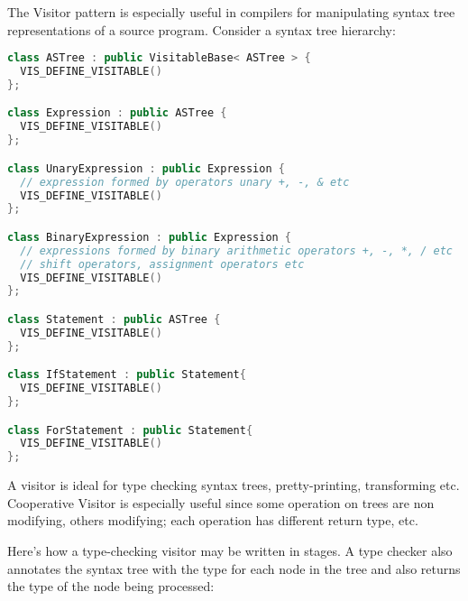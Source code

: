 \documentclass{book}
\begin{document}
The Visitor pattern is especially useful in compilers for manipulating syntax tree representations of a source program. Consider a syntax tree hierarchy:

\begin{lstlisting}[caption={visitor pattern sample code 5, commandexample.cpp},language=C++]
class ASTree : public VisitableBase< ASTree > {
  VIS_DEFINE_VISITABLE()
};

class Expression : public ASTree { 
  VIS_DEFINE_VISITABLE()
};

class UnaryExpression : public Expression {
  // expression formed by operators unary +, -, & etc
  VIS_DEFINE_VISITABLE()
};

class BinaryExpression : public Expression {
  // expressions formed by binary arithmetic operators +, -, *, / etc
  // shift operators, assignment operators etc
  VIS_DEFINE_VISITABLE()
};

class Statement : public ASTree {
  VIS_DEFINE_VISITABLE()
};

class IfStatement : public Statement{
  VIS_DEFINE_VISITABLE()
};

class ForStatement : public Statement{
  VIS_DEFINE_VISITABLE()
};
\end{lstlisting}

A visitor is ideal for type checking syntax trees, pretty-printing, transforming etc.
Cooperative Visitor is especially useful since some operation on trees are non modifying, others modifying; each operation has different return type, etc.

Here's how a type-checking visitor may be written in stages.
A type checker also annotates the syntax tree with the type for each node in the tree and also returns the type of the node being processed:
\end{document}
